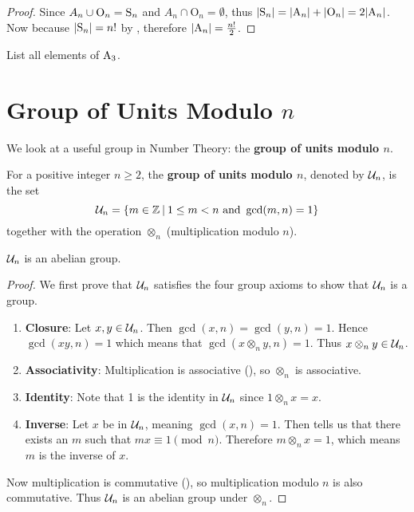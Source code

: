 \begin{proof}
    Since $A_n \cup \mathrm{O}_n = \mathrm{S}_{n}$ and $A_n \cap \mathrm{O}_n = \emptyset$, thus $|\mathrm{S}_{n}| = |\mathrm{A}_{n}| + |\mathrm{O}_n| = 2|\mathrm{A}_{n}|$. Now because $|\mathrm{S}_{n}| = n!$ by , therefore $|\mathrm{A}_{n}| = \frac{n!}2$.
\end{proof}

\begin{exercise}
    List all elements of $\mathrm{A}_{3}$.
\end{exercise}

\section{Group of Units Modulo \texorpdfstring{$n$}{n}}
We look at a useful group in Number Theory: the \textbf{group of units modulo $n$}.

\begin{definition}
    For a positive integer $n \geq 2$, the \textbf{group of units modulo $n$}, denoted by $\mathcal{U}_{n}$, is the set
    \[
        \Un{n} = \{m \in \Z \vert 1 \leq m < n \text{ and } \gcd(m, n) = 1\}
    \]
    together with the operation $\otimes_n$ (multiplication modulo $n$).
\end{definition}

\begin{proposition}
    $\mathcal{U}_{n}$ is an abelian group.
\end{proposition}
\begin{proof}
    We first prove that $\mathcal{U}_{n}$ satisfies the four group axioms to show that $\mathcal{U}_{n}$ is a group.
    \begin{enumerate}
        \item \textbf{Closure}: Let $x, y \in \mathcal{U}_{n}$. Then $\gcd(x, n) = \gcd(y, n) = 1$. Hence $\gcd(xy, n) = 1$ which means that $\gcd(x\otimes_ny,n)=1$. Thus $x\otimes_ny \in \mathcal{U}_{n}$.
        
        \item \textbf{Associativity}: Multiplication is associative (), so $\otimes_n$ is associative.
        
        \item \textbf{Identity}: Note that 1 is the identity in $\mathcal{U}_{n}$ since $1 \otimes_n x = x$.
        
        \item \textbf{Inverse}: Let $x$ be in $\mathcal{U}_{n}$, meaning $\gcd(x, n) = 1$. Then  tells us that there exists an $m$ such that $mx \equiv 1 \pmod n$. Therefore $m \otimes_n x = 1$, which means $m$ is the inverse of $x$.
    \end{enumerate}
    Now multiplication is commutative (), so multiplication modulo $n$ is also commutative. Thus $\mathcal{U}_{n}$ is an abelian group under $\otimes_n$.
\end{proof}

